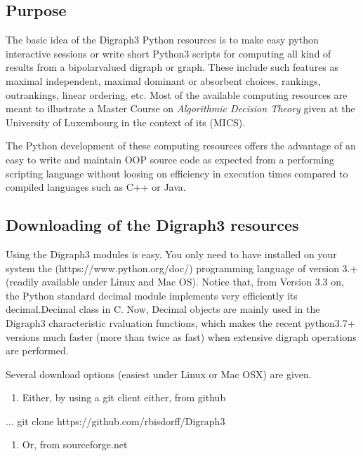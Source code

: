 \documentclass[a4paper,12pt,english]{sphinxhowto}
\begin{document}
\subsection{Purpose}
\label{\detokenize{tutorial:purpose}}
The basic idea of the Digraph3 Python resources is to make easy python interactive sessions or write short Python3 scripts for computing all kind of results from a bipolar\sphinxhyphen{}valued digraph or graph. These include such features as maximal independent, maximal dominant or absorbent choices, rankings, outrankings, linear ordering, etc. Most of the available computing resources are meant to illustrate a Master Course  on \emph{Algorithmic Decision Theory} given at the University of Luxembourg in the context of its  (MICS).

The Python development of these computing resources offers the advantage of an easy to write and maintain OOP source code as expected from a performing scripting language without loosing on efficiency in execution times compared to compiled languages such as C++ or Java.


\subsection{Downloading of the Digraph3 resources}
\label{\detokenize{tutorial:downloading-of-the-digraph3-resources}}
Using the Digraph3 modules is easy. You only need to have installed on your system the  (https://www.python.org/doc/) programming language of version 3.+ (readily available under Linux and Mac OS). Notice that, from Version 3.3 on, the Python standard decimal module implements very efficiently its decimal.Decimal class in C. Now, Decimal objects are mainly used in the Digraph3 characteristic r\sphinxhyphen{}valuation functions, which makes the recent python\sphinxhyphen{}3.7+ versions much faster (more than twice as fast) when extensive digraph operations are performed.

Several download options (easiest under Linux or Mac OS\sphinxhyphen{}X) are given.
\begin{enumerate}
%
\item {} 
Either, by using a git client either, from github

\end{enumerate}

\begin{sphinxVerbatim}[commandchars=\\\{\}]
...\PYGZdl{} git clone https://github.com/rbisdorff/Digraph3
\end{sphinxVerbatim}
\begin{enumerate}
%
\setcounter{enumi}{1}
\item {} 
Or, from sourceforge.net

\end{enumerate}
\end{document}
